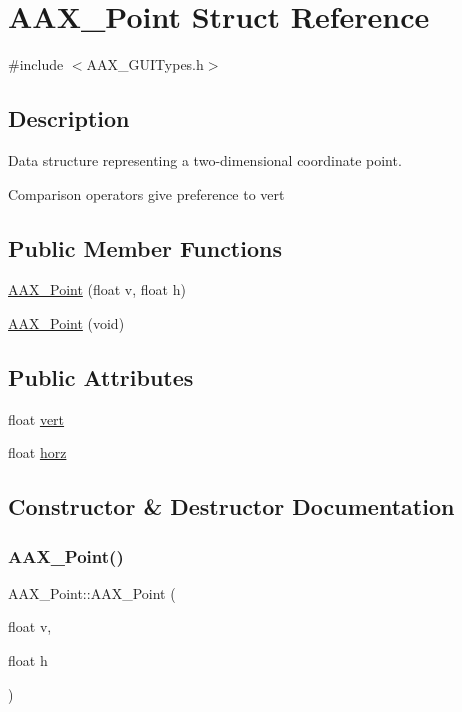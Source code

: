 \hypertarget{a01609}{}\section{A\+A\+X\+\_\+\+Point Struct Reference}
\label{a01609}


{\ttfamily \#include $<$A\+A\+X\+\_\+\+G\+U\+I\+Types.\+h$>$}



\subsection{Description}
Data structure representing a two-\/dimensional coordinate point. 

Comparison operators give preference to {\ttfamily vert} \subsection*{Public Member Functions}
\begin{DoxyCompactItemize}
\item 
\mbox{\hyperlink{a01609_a3778e9c4e6219bda00b9f7ca1fcfc33f}{A\+A\+X\+\_\+\+Point}} (float v, float h)
\item 
\mbox{\hyperlink{a01609_a8f6d76eefb8ebc2e511c8e548d0b4c13}{A\+A\+X\+\_\+\+Point}} (void)
\end{DoxyCompactItemize}
\subsection*{Public Attributes}
\begin{DoxyCompactItemize}
\item 
float \mbox{\hyperlink{a01609_a63dc61a7272f2af67a3a75c438afa39a}{vert}}
\item 
float \mbox{\hyperlink{a01609_ac4f9194d96ae6a2547194139a5f6abb2}{horz}}
\end{DoxyCompactItemize}


\subsection{Constructor \& Destructor Documentation}
\mbox{\label{a01609_a3778e9c4e6219bda00b9f7ca1fcfc33f}} 
\subsubsection{\texorpdfstring{AAX\_Point()}{AAX\_Point()}\hspace{0.1cm}{\footnotesize\ttfamily [1/2]}}
{\footnotesize\ttfamily A\+A\+X\+\_\+\+Point\+::\+A\+A\+X\+\_\+\+Point (\begin{DoxyParamCaption}\item[{float}]{v,  }\item[{float}]{h }\end{DoxyParamCaption})\hspace{0.3cm}{\ttfamily [inline]}}


